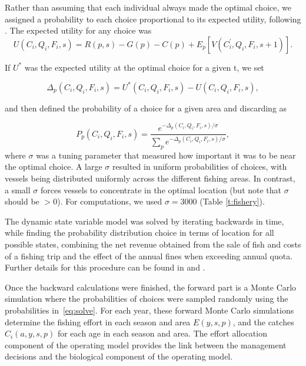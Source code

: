 \documentclass[12pt,oneline,a4paper,numbib]{ouparticle}
\numberwithin{equation}{subsection} %
\begin{document}
Rather than assuming that each individual always made the optimal choice, we assigned a probability to each choice proportional to its expected utility, following \cite{Dowling2011}. The expected utility for any choice was
\begin{equation}
U (C_i, Q_i, F_i, s) = R(p, s)- G(p) - C(p) + E_{p}[V (C_i^\prime, Q_i, F_i, s+1)].
\end{equation}

If $U^*$ was the expected utility at the optimal choice for a given t, we set

\begin{equation}
\Delta_{p}(C_i, Q_i, F_i, s) =  U^* (C_i, Q_i, F_i, s) - U (C_i, Q_i, F_i, s),
\end{equation}

and then defined the probability of a choice for a given area and discarding as	

\begin{equation} \label{eq:solve}
P_{p}(C_i, Q_i, F_i, s) = \frac
                {e^{ -\Delta_{p}(C_i, Q_i, F_i, s)/\sigma}}
                {\sum_p e^{ -\Delta_{p}(C_i, Q_i, F_i, s)/\sigma}},
\end{equation}
where $\sigma$ was a tuning parameter that measured how important it was to be near the optimal choice. A large $\sigma$ resulted in uniform probabilities of choices, with vessels being distributed uniformly across the different fishing areas. In contrast, a small $\sigma$ forces vessels to concentrate in the optimal location (but note that $\sigma$ should be $> 0$). For computations, we used $\sigma = 3000$ (Table \ref{t:fishery}). %

The dynamic state variable model was solved by iterating backwards in time, while finding the probability distribution choice in terms of location for all possible states, combining the net revenue obtained from the sale of fish and costs of a fishing trip and the effect of the annual fines when exceeding annual quota. Further details for this procedure can be found in \cite{Alzorriz2018, Batsleer2016} and \cite{Dowling2011}.

Once the backward calculations were finished, the forward part is a Monte Carlo simulation where the probabilities of choices were sampled randomly using the probabilities in~\ref{eq:solve}. For each year, these forward Monte Carlo simulations determine the fishing effort in each season and area $E(y,s,p)$, and the catches $C_i (a, y, s, p)$ for each age in each season and area. The effort allocation component of the operating model provides the link between the management decisions and the biological component of the operating model.
\end{document}
